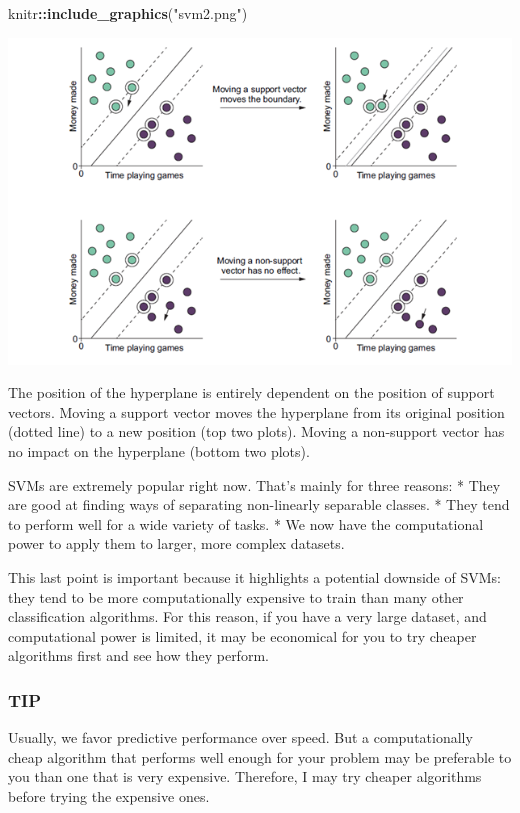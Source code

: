\documentclass[
]{article}
\newenvironment{Shaded}{\begin{snugshade}}{\end{snugshade}}
\newcommand{\FunctionTok}[1]{\textcolor[rgb]{0.13,0.29,0.53}{\textbf{#1}}}
\newcommand{\NormalTok}[1]{#1}
\newcommand{\SpecialCharTok}[1]{\textcolor[rgb]{0.81,0.36,0.00}{\textbf{#1}}}
\newcommand{\StringTok}[1]{\textcolor[rgb]{0.31,0.60,0.02}{#1}}
\begin{document}
\begin{Shaded}
\begin{Highlighting}[]
\NormalTok{knitr}\SpecialCharTok{::}\FunctionTok{include\_graphics}\NormalTok{(}\StringTok{"svm2.png"}\NormalTok{)}
\end{Highlighting}
\end{Shaded}

\includegraphics[width=8.67in]{svm2}

The position of the hyperplane is entirely dependent on the position of
support vectors. Moving a support vector moves the hyperplane from its
original position (dotted line) to a new position (top two plots).
Moving a non-support vector has no impact on the hyperplane (bottom two
plots).

SVMs are extremely popular right now. That's mainly for three reasons: *
They are good at finding ways of separating non-linearly separable
classes. * They tend to perform well for a wide variety of tasks. * We
now have the computational power to apply them to larger, more complex
datasets.

This last point is important because it highlights a potential downside
of SVMs: they tend to be more computationally expensive to train than
many other classification algorithms. For this reason, if you have a
very large dataset, and computational power is limited, it may be
economical for you to try cheaper algorithms first and see how they
perform.

\subsubsection{TIP}\label{tip-1}

Usually, we favor predictive performance over speed. But a
computationally cheap algorithm that performs well enough for your
problem may be preferable to you than one that is very expensive.
Therefore, I may try cheaper algorithms before trying the expensive
ones.
\end{document}
